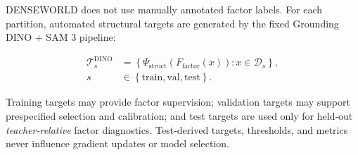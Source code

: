 DENSEWORLD does not use manually annotated factor labels. For each
partition, automated structural targets are generated by the fixed
Grounding DINO + SAM 3 pipeline:

\begin{equation*}
\begin{aligned}
\mathcal T_s^{\mathrm{DINO}}
&=
\left\{
\Psi_{\mathrm{struct}}
\!\left(
F_{\mathrm{factor}}(x)
\right)
:
x\in\mathcal D_s
\right\},
\\[-1pt]
s
&\in
\left\{
\mathrm{train},
\mathrm{val},
\mathrm{test}
\right\}.
\end{aligned}
\end{equation*}


Training targets may provide factor supervision; validation targets may
support prespecified selection and calibration; and test targets are
used only for held-out \emph{teacher-relative} factor diagnostics.
Test-derived targets, thresholds, and metrics never influence gradient
updates or model selection.

